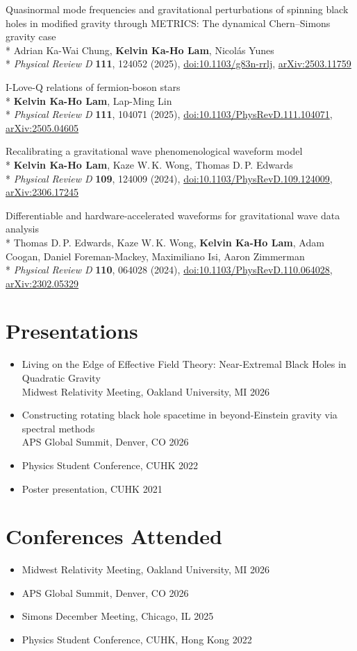 \documentclass[11pt]{article}
\newcommand{\pub}[3]{\item #1\\* #2\\* #3}
\newcommand{\me}{\textbf{Kelvin Ka-Ho Lam}}
\newcommand{\arxiv}[1]{\href{https://arxiv.org/abs/#1}{arXiv:#1}}
\newcommand{\doi}[1]{\href{https://doi.org/#1}{doi:#1}}
\begin{document}
{\begin{enumerate}[leftmargin=2.4em, itemsep=2pt, label={[\revnum*]}]
\pub{Quasinormal mode frequencies and gravitational perturbations of spinning black holes in modified gravity through METRICS: The dynamical Chern--Simons gravity case}
    {Adrian Ka-Wai Chung, \me, Nicolás Yunes}
    {\textit{Physical Review D} \textbf{111}, 124052 (2025), \doi{10.1103/g83n-rrlj}, \arxiv{2503.11759}}

\pub{I-Love-Q relations of fermion-boson stars}
    {\me, Lap-Ming Lin}
    {\textit{Physical Review D} \textbf{111}, 104071 (2025), \doi{10.1103/PhysRevD.111.104071}, \arxiv{2505.04605}}

\pub{Recalibrating a gravitational wave phenomenological waveform model}
    {\me, Kaze W.\,K. Wong, Thomas D.\,P. Edwards}
    {\textit{Physical Review D} \textbf{109}, 124009 (2024), \doi{10.1103/PhysRevD.109.124009}, \arxiv{2306.17245}}

\pub{Differentiable and hardware-accelerated waveforms for gravitational wave data analysis}
    {Thomas D.\,P. Edwards, Kaze W.\,K. Wong, \me, Adam Coogan, Daniel Foreman-Mackey, Maximiliano Isi, Aaron Zimmerman}
    {\textit{Physical Review D} \textbf{110}, 064028 (2024), \doi{10.1103/PhysRevD.110.064028}, \arxiv{2302.05329}}

\end{enumerate}
\par}

\section*{Presentations}
\begin{itemize}
  \item Living on the Edge of Effective Field Theory: Near-Extremal Black Holes in Quadratic Gravity\\
        Midwest Relativity Meeting, Oakland University, MI \hfill 2026
  \item Constructing rotating black hole spacetime in beyond-Einstein gravity via spectral methods\\
        APS Global Summit, Denver, CO \hfill 2026
  \item Physics Student Conference, CUHK \hfill 2022
  \item Poster presentation, CUHK \hfill 2021
\end{itemize}

\section*{Conferences Attended}
\begin{itemize}
  \item Midwest Relativity Meeting, Oakland University, MI \hfill 2026
  \item APS Global Summit, Denver, CO \hfill 2026
  \item Simons December Meeting, Chicago, IL \hfill 2025
  \item Physics Student Conference, CUHK, Hong Kong \hfill 2022
\end{itemize}
\end{document}

